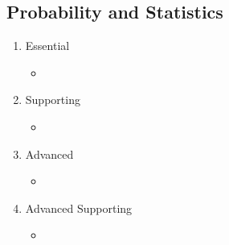 \documentclass{article}
\begin{document}
\subsection*{Probability and Statistics}
\begin{enumerate}
	\item Essential
	\begin{itemize}
		\item
	\end{itemize}		
	\item Supporting
	\begin{itemize}
		\item
	\end{itemize}
	\item Advanced
	\begin{itemize}
		\item
	\end{itemize}
	\item Advanced Supporting
	\begin{itemize}
		\item
	\end{itemize}
\end{enumerate}
\end{document}

